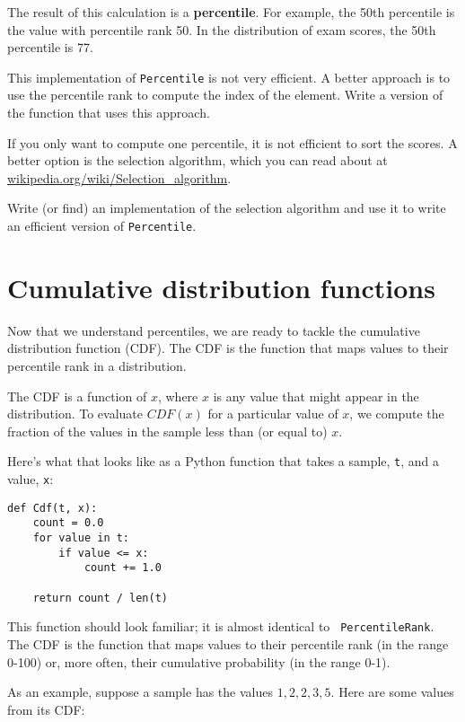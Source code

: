 \documentclass[10pt]{book}
\begin{document}
The result of this calculation is a {\bf percentile}.  For example,
the 50th percentile is the value with percentile rank 50.  In the
distribution of exam scores, the 50th percentile is 77.

\begin{ex}
This implementation of {\tt Percentile} is not very efficient.  A
better approach is to use the percentile rank to compute the index
of the element.  Write a version of the function that uses this
approach.
\end{ex}

\begin{ex}
If you only want to compute one percentile, it is not efficient
to sort the scores.  A better option is the selection algorithm,
which you can read about at \url{wikipedia.org/wiki/Selection_algorithm}.

Write (or find) an implementation of the selection algorithm and use
it to write an efficient version of {\tt Percentile}.
\end{ex}


\section{Cumulative distribution functions}

Now that we understand percentiles, we are ready to tackle the
cumulative distribution function (CDF).  The CDF is the function that
maps values to their percentile rank in a distribution.

The CDF is a function of $x$, where $x$ is any value that might appear
in the distribution.  To evaluate $CDF(x)$ for a particular value of
$x$, we compute the fraction of the values in the sample less than (or
equal to) $x$.

Here's what that looks like as a Python function that takes
a sample, {\tt t}, and a value, {\tt x}:

\begin{verbatim}
def Cdf(t, x):
    count = 0.0
    for value in t:
        if value <= x:
            count += 1.0

    return count / len(t)
\end{verbatim}

This function should look familiar; it is almost identical to {\tt
  PercentileRank}.  The CDF is the function that maps values to their
percentile rank (in the range 0-100) or, more often, their
cumulative probability (in the range 0-1).

As an example, suppose a sample has the values ${1, 2, 2, 3, 5}$.
Here are some values from its CDF:
\end{document}
